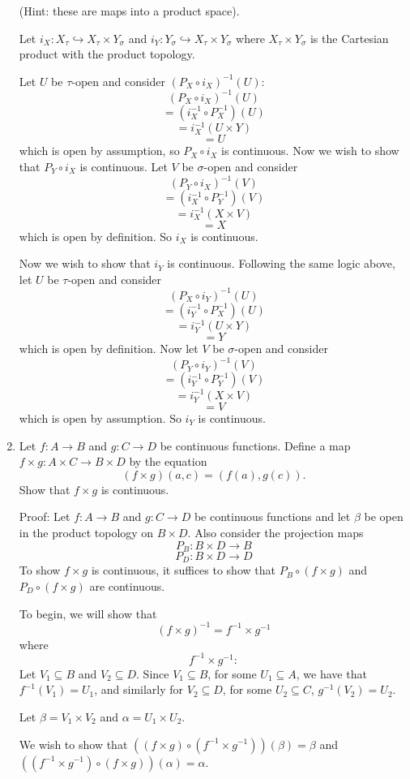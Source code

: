\documentclass[12pt]{article}
\begin{document}
\begin{enumerate}
(Hint: these are maps into a product space).

Let $i_X : X_{\tau} \hookrightarrow X_{\tau} \times Y_{\sigma}$ and $i_Y : Y_{\sigma} \hookrightarrow X_{\tau} \times Y_{\sigma}$ where $X_{\tau} \times Y_{\sigma}$ is the Cartesian product with the product topology. 

Let $U$ be $\tau$-open and consider $(P_X \circ i_X)^{-1}(U)$:
\[(P_X \circ i_X)^{-1}(U)\]
\[ = (i_X^{-1} \circ P_X^{-1})(U)\]
\[ = i_X^{-1}(U \times Y)\]
\[ = U\]
which is open by assumption, so $P_X \circ i_X$ is continuous. Now we wish to show that $P_Y \circ i_X$ is continuous. Let $V$ be $\sigma$-open and consider
\[(P_Y \circ i_X)^{-1}(V)\]
\[ = (i_X^{-1} \circ P_Y^{-1})(V)\]
\[ = i_X^{-1}(X \times V)\]
\[ = X\]
which is open by definition. So $i_X$ is continuous. 

Now we wish to show that $i_Y$ is continuous. Following the same logic above, let $U$ be $\tau$-open and consider
\[(P_X \circ i_Y)^{-1}(U)\]
\[ = (i_Y^{-1} \circ P_X^{-1})(U)\]
\[ = i_Y^{-1}(U \times Y)\]
\[ = Y\]
which is open by definition. Now let $V$ be $\sigma$-open and consider
\[(P_Y \circ i_Y)^{-1}(V)\]
\[ = (i_Y^{-1} \circ P_Y^{-1})(V)\]
\[ = i_Y^{-1}(X \times V)\]
\[ = V\]
which is open by assumption. So $i_Y$ is continuous.




\item Let $f: A \to B$ and $g: C \to D$ be continuous functions. Define a map $f\times g: A\times C \to B\times D$ by the equation $$(f\times g)(a,c) = (f(a), g(c)).$$ Show that $f\times g$ is continuous.

Proof: Let $f: A \to B$ and $g: C \to D$ be continuous functions and let $\beta$ be open in the product topology on $B \times D$. 
Also consider the projection maps
\[P_B : B \times D \to B\]
\[P_D : B \times D \to D\]
To show $f \times g$ is continuous, it suffices to show that $P_B \circ (f \times g)$ and $P_D \circ (f \times g)$ are continuous. 

To begin, we will show that 
\[(f \times g)^{-1} = f^{-1} \times g^{-1}\]
where
\[f^{-1} \times g^{-1}:\]
Let $V_1 \subseteq B$ and $V_2 \subseteq D$.
Since $V_1 \subseteq B$, for some $U_1 \subseteq A$, we have that $f^{-1}(V_1) = U_1$, and similarly for $V_2 \subseteq D$, for some $U_2 \subseteq C$, $g^{-1}(V_2) = U_2$.

Let $\beta = V_1 \times V_2$ and $\alpha = U_1 \times U_2$.

We wish to show that $((f \times g) \circ (f^{-1} \times g^{-1}))(\beta) = \beta$ and $((f^{-1} \times g^{-1}) \circ (f \times g))(\alpha) = \alpha$.


\end{enumerate}
\end{document}
